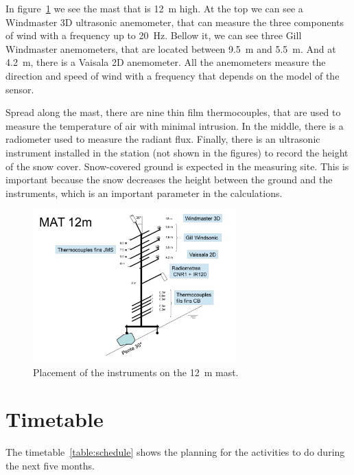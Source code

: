 \documentclass[a4paper,12pt]{article}
\begin{document}
In figure~\ref{fig:mast_12} we see the mast that is 12~m high. At the top we can see a Windmaster 3D ultrasonic anemometer, that can measure the three components of wind with a frequency up to 20~Hz. Bellow it, we can see three Gill Windmaster anemometers, that are located between 9.5~m and 5.5~m. And at 4.2~m, there is a Vaisala 2D anemometer.  All the anemometers measure the direction and speed of wind with a frequency that depends on the model of the sensor. 

Spread along the mast, there are nine thin film thermocouples, that are used to measure the temperature of air with minimal intrusion. In the middle, there is a radiometer used to measure the radiant flux. Finally, there is an ultrasonic instrument installed in the station (not shown in the figures) to record the height of the snow cover. Snow-covered ground is expected in the measuring site. This is important because the snow decreases the height between the ground and the instruments, which is an important parameter in the calculations.

\begin{figure}[!ht]
  \begin{center}
  \includegraphics[width=0.7\textwidth]{fig/0002.jpg}
  \caption{Placement of the instruments on the 12~m mast.}
  \label{fig:mast_12}
  \end{center}
\end{figure}

\section{Timetable}
The timetable~\ref{table:schedule} shows the planning for the activities to do during the next five months. 
\end{document}
